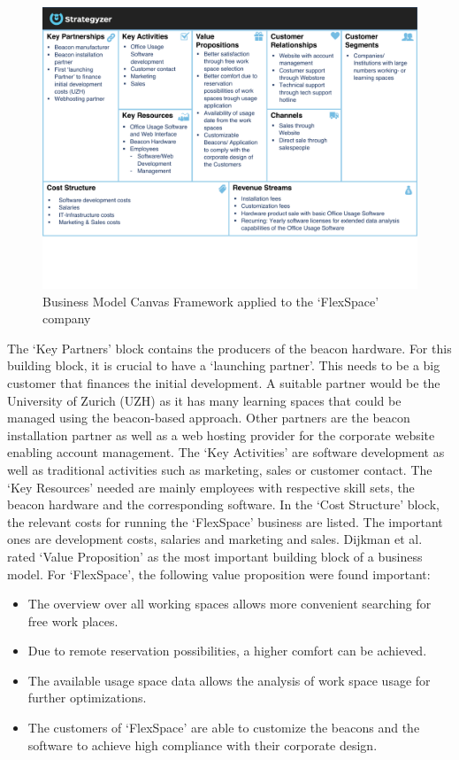 			\begin{figure}[ht]
			    \begin{center}
			    \includegraphics[scale=0.7]{Talk11/use_case_dijkman.pdf}
			    \end{center}
			    \caption{Business Model Canvas Framework applied to the `FlexSpace' company}
			    \label{fig:bmc_flex}
			\end{figure}
		The `Key Partners' block contains the producers of the beacon hardware. For this building block, it is crucial to have a `launching partner'. This needs to be a big customer that finances the initial development. A suitable partner would be the University of Zurich (UZH) as it has many learning spaces that could be managed using the beacon-based approach. Other partners are the beacon installation partner as well as a web hosting provider for the corporate website enabling account management. The `Key Activities' are software development as well as traditional activities such as marketing, sales or customer contact. The `Key Resources' needed are mainly employees with respective skill sets, the beacon hardware and the corresponding software. In the `Cost Structure' block, the relevant costs for running the `FlexSpace' business are listed. The important ones are development costs, salaries and marketing and sales. Dijkman et al. \cite{dijkman} rated `Value Proposition' as the most important building block of a business model. For `FlexSpace', the following value proposition were found important:
		\vspace{-1em}
		\begin{itemize}
			\item The overview over all working spaces allows more convenient searching for free work places.
			\item Due to remote reservation possibilities, a higher comfort can be achieved. 
			\item The available usage space data allows the analysis of work space usage for further optimizations.
			\item The customers of `FlexSpace' are able to customize the beacons and the software to achieve high compliance with their corporate design.  
		\end{itemize}
